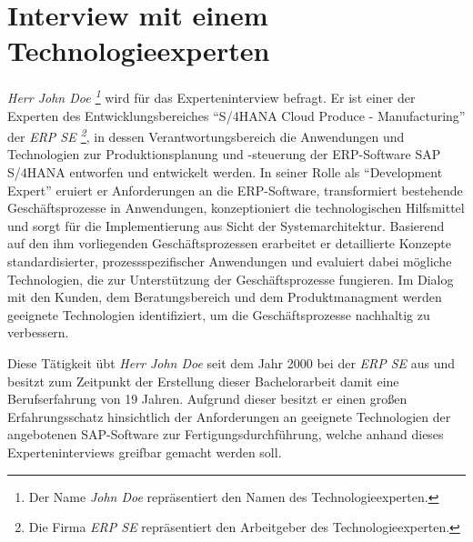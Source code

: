 \tocless\section{Interview mit einem Technologieexperten}

\textit{Herr John Doe \footnote{Der Name \textit{John Doe} repräsentiert den Namen des Technologieexperten.}} wird für das Experteninterview befragt.
 Er ist einer der Experten des Entwicklungsbereiches \enquote{S/4HANA Cloud Produce - Manufacturing} der \textit{ERP SE \footnote{Die Firma \textit{ERP SE} repräsentiert den Arbeitgeber des Technologieexperten.}}, in dessen Verantwortungsbereich die Anwendungen und Technologien zur Produktionsplanung und -steuerung der ERP-Software SAP S/4HANA entworfen und entwickelt werden.
 In seiner Rolle als \enquote{Development Expert} eruiert er Anforderungen an die ERP-Software, transformiert bestehende Geschäftsprozesse in Anwendungen, konzeptioniert die technologischen Hilfsmittel und sorgt für die Implementierung aus Sicht der Systemarchitektur. Basierend auf den ihm vorliegenden Geschäftsprozessen erarbeitet er detaillierte Konzepte standardisierter, prozessspezifischer Anwendungen und evaluiert dabei mögliche Technologien, die zur Unterstützung der Geschäftsprozesse fungieren. Im Dialog mit den Kunden, dem Beratungsbereich und dem Produktmanagment werden geeignete Technologien identifiziert, um die Geschäftsprozesse nachhaltig zu verbessern. 
 
Diese Tätigkeit übt \textit{Herr John Doe} seit dem Jahr 2000 bei der \textit{ERP SE} aus und besitzt zum Zeitpunkt der Erstellung dieser Bachelorarbeit damit eine Berufserfahrung von 19 Jahren. Aufgrund dieser besitzt er einen großen Erfahrungsschatz hinsichtlich der Anforderungen an geeignete Technologien der angebotenen SAP-Software zur Fertigungsdurchführung, welche anhand dieses Experteninterviews greifbar gemacht werden soll.


